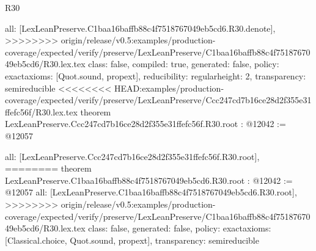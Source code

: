\begin{lexlean}{R30}
\begin{coremodule}
{{{{{  all: [LexLeanPreserve.C1baa16baffb88c4f7518767049eb5cd6.R30.denote],
>>>>>>>> origin/release/v0.5:examples/production-coverage/expected/verify/preserve/LexLeanPreserve/C1baa16baffb88c4f7518767049eb5cd6/R30.lex.tex
  class: false,
  compiled: true,
  generated: false,
  policy: exact{axioms: [Quot.sound, propext]},
  reducibility: regular{height: 2},
  transparency: semireducible
}
<<<<<<<< HEAD:examples/production-coverage/expected/verify/preserve/LexLeanPreserve/Ccc247cd7b16ce28d2f355e31ffefc56f/R30.lex.tex
theorem LexLeanPreserve.Ccc247cd7b16ce28d2f355e31ffefc56f.R30.root : @12042 := @12057 {
  all: [LexLeanPreserve.Ccc247cd7b16ce28d2f355e31ffefc56f.R30.root],
========
theorem LexLeanPreserve.C1baa16baffb88c4f7518767049eb5cd6.R30.root : @12042 := @12057 {
  all: [LexLeanPreserve.C1baa16baffb88c4f7518767049eb5cd6.R30.root],
>>>>>>>> origin/release/v0.5:examples/production-coverage/expected/verify/preserve/LexLeanPreserve/C1baa16baffb88c4f7518767049eb5cd6/R30.lex.tex
  class: false,
  generated: false,
  policy: exact{axioms: [Classical.choice, Quot.sound, propext]},
  transparency: semireducible
}

}}}}}
\end{coremodule}
\end{lexlean}
